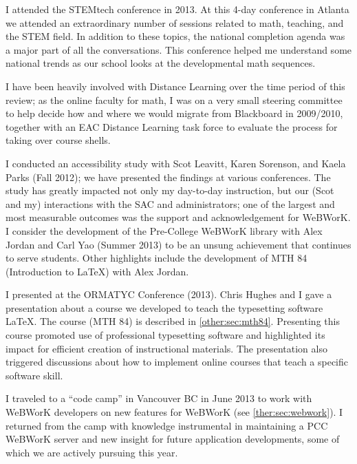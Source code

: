 \begin{description}[style=nextline]
	I attended the STEMtech conference in 2013.  At this 4-day conference in
	Atlanta we attended an extraordinary number of sessions related to math,
	teaching, and the STEM field.  In addition to these topics, the national
	completion agenda was a major part of all the conversations.  This conference
	helped me understand some national trends as our school looks at the
	developmental math sequences.

	\item[Chris Hughes (Full-time faculty, Cascade)]
	I have been heavily involved with Distance Learning over the time period of
	this review; as the online faculty for math, I was on a very small steering
	committee to help decide how and where we would migrate from Blackboard in
	2009/2010, together with an EAC Distance Learning task force to evaluate the
	process for taking over course shells.

	I conducted an accessibility study with Scot Leavitt, Karen Sorenson, and Kaela
	Parks (Fall 2012); we have presented the findings at various conferences. The
	study has greatly impacted not only my day-to-day instruction, but our (Scot
	and my) interactions with the SAC and administrators; one of the largest and
	most measurable outcomes was the support and acknowledgement for WeBWorK. I
	consider the development of the Pre-College WeBWorK library with Alex Jordan
	and Carl Yao (Summer 2013) to be an unsung achievement that continues to serve
	students. Other highlights include the development of MTH 84 (Introduction to
	LaTeX) with Alex Jordan.

	\item[Alex Jordan (Full-time Instructor, Sylvania Campus)]
	I presented at the ORMATYC Conference (2013).  Chris Hughes and I gave a
	presentation about a course we developed to teach the typesetting software
	\LaTeX.  The course (MTH 84) is described in \vref{other:sec:mth84}. Presenting
	this course promoted use of professional typesetting software and highlighted
	its impact for efficient creation of instructional materials. The presentation
	also triggered discussions about how to implement online courses that teach a
	specific software skill.

	I traveled to a ``code camp'' in Vancouver BC in June 2013 to work with WeBWorK
	developers on new features for WeBWorK (see \vref{ther:sec:webwork}).  I returned
	from the camp with knowledge instrumental in maintaining a PCC WeBWorK server
	and new insight for future application developments, some of which we are
	actively pursuing this year.


\end{description}
